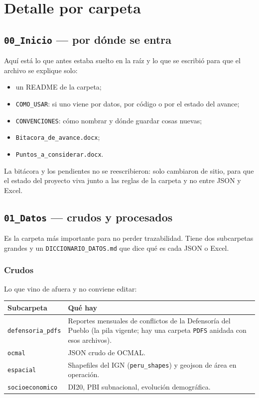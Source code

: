 \documentclass[11pt,a4paper]{article}
\begin{document}
\section{Detalle por carpeta}

\subsection{\texttt{00\_Inicio} --- por dónde se entra}

Aquí está lo que antes estaba suelto en la raíz y lo que se escribió para que el archivo se explique solo:

\begin{itemize}
  \item un README de la carpeta;
  \item \texttt{COMO\_USAR}: si uno viene por datos, por código o por el estado del avance;
  \item \texttt{CONVENCIONES}: cómo nombrar y dónde guardar cosas nuevas;
  \item \texttt{Bitacora\_de\_avance.docx};
  \item \texttt{Puntos\_a\_considerar.docx}.
\end{itemize}

La bitácora y los pendientes no se reescribieron: solo cambiaron de sitio, para que el estado del proyecto viva junto a las reglas de la carpeta y no entre JSON y Excel.

\subsection{\texttt{01\_Datos} --- crudos y procesados}

Es la carpeta más importante para no perder trazabilidad. Tiene dos subcarpetas grandes y un \texttt{DICCIONARIO\_DATOS.md} que dice qué es cada JSON o Excel.

\subsubsection{Crudos}

Lo que vino de afuera y no conviene editar:

\begin{center}
\renewcommand{\arraystretch}{1.2}
\begin{tabularx}{\textwidth}{@{}l Y@{}}
\toprule
\textbf{Subcarpeta} & \textbf{Qué hay} \\
\midrule
\texttt{defensoria\_pdfs} & Reportes mensuales de conflictos de la Defensoría del Pueblo (la pila vigente; hay una carpeta \texttt{PDFS} anidada con esos archivos). \\
\texttt{ocmal} & JSON crudo de OCMAL. \\
\texttt{espacial} & Shapefiles del IGN (\texttt{peru\_shapes}) y geojson de área en operación. \\
\texttt{socioeconomico} & DI20, PBI subnacional, evolución demográfica. \\
\bottomrule
\end{tabularx}
\end{center}
\end{document}
